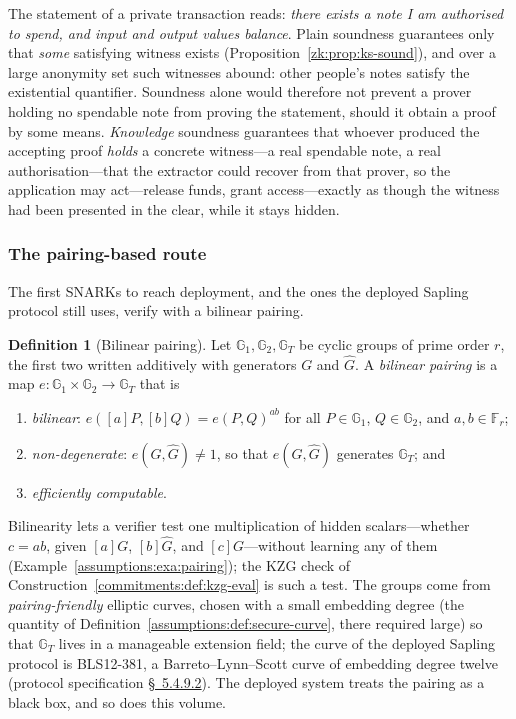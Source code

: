 \documentclass[11pt,a4paper]{article}
\theoremstyle{definition}
\newtheorem{definition}[theorem]{Definition}
\theoremstyle{remark}
\newcommand{\G}{\ensuremath{\mathbb{G}}}
\newcommand{\Fr}{\ensuremath{\mathbb{F}_{r}}}
\begin{document}
The statement of a private transaction reads: \emph{there exists a
note I am authorised to spend, and input and output values balance}.
Plain soundness guarantees only that \emph{some} satisfying witness
exists (Proposition~\ref{zk:prop:ks-sound}), and over a large anonymity
set such witnesses abound: other
people's notes satisfy the existential quantifier. Soundness alone
would therefore not prevent a prover holding no spendable note from
proving the statement, should it obtain a proof by some means.
\emph{Knowledge} soundness guarantees that whoever produced the
accepting proof \emph{holds} a concrete witness---a real spendable
note, a real authorisation---that the extractor could recover from
that prover, so the application may act---release funds, grant
access---exactly as though the witness had been presented in the
clear, while it stays hidden.

\subsubsection*{The pairing-based route}

The first SNARKs to reach deployment, and the ones the deployed
Sapling protocol still uses, verify with a bilinear pairing.

\begin{definition}[Bilinear pairing]\label{zk:def:pairing}
Let \(\G_1, \G_2, \G_T\) be cyclic groups of prime order \(r\), the
first two written additively with generators \(G\) and \(\hat G\).
A \emph{bilinear pairing} is a map
\(e \colon \G_1 \times \G_2 \to \G_T\) that is
\begin{enumerate}
\item \emph{bilinear}: \(e([a]P, [b]Q) = e(P, Q)^{ab}\) for all
  \(P \in \G_1\), \(Q \in \G_2\), and \(a, b \in \Fr\);
\item \emph{non-degenerate}: \(e(G, \hat G) \ne 1\), so that
  \(e(G, \hat G)\) generates \(\G_T\); and
\item \emph{efficiently computable}.
\end{enumerate}
Bilinearity lets a verifier test one multiplication of hidden
scalars---whether \(c = ab\), given \([a]G\), \([b]\hat G\), and
\([c]G\)---without learning any of them
(Example~\ref{assumptions:exa:pairing}); the KZG check of
Construction~\ref{commitments:def:kzg-eval} is such a test. The
groups come from \emph{pairing-friendly} elliptic curves, chosen
with a small embedding degree (the quantity of
Definition~\ref{assumptions:def:secure-curve}, there required
large) so that \(\G_T\) lives in a manageable extension field; the
curve of the deployed Sapling protocol is BLS12-381, a
Barreto--Lynn--Scott curve of embedding degree twelve (protocol
specification \href{https://zips.z.cash/protocol/protocol.pdf\#blspairing}{\S~5.4.9.2}). The deployed system treats the pairing
as a black box, and so does this volume.
\end{definition}
\end{document}
